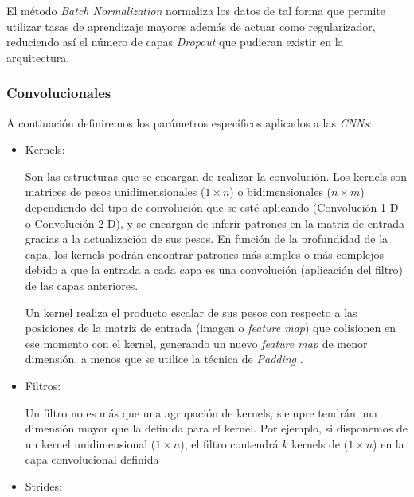 \begin{itemize}
                    El método \textit{Batch Normalization} \cite{BatchNormalization} normaliza los datos de tal forma que permite utilizar tasas de aprendizaje mayores además de actuar como regularizador, reduciendo así el número de capas \textit{Dropout} que pudieran existir en la arquitectura.

            \end{itemize}

            \subsubsection{Convolucionales}

                A contiuación definiremos los parámetros específicos aplicados a las \textit{CNNs}:

                \begin{itemize}

                    \item Kernels:

                        Son las estructuras que se encargan de realizar la convolución. Los kernels son matrices de pesos unidimensionales ($1 \times n$) o bidimensionales ($n \times m$) dependiendo del tipo de convolución que se esté aplicando (Convolución 1-D o Convolución 2-D), y se encargan de inferir patrones en la matriz de entrada gracias a la actualización de sus pesos. En función de la profundidad de la capa, los kernels podrán encontrar patrones más simples o más complejos debido a que la entrada a cada capa es una convolución (aplicación del filtro) de las capas anteriores.

                        Un kernel realiza el producto escalar de sus pesos con respecto a las posiciones de la matriz de entrada (imagen o \textit{feature map}) que colisionen en ese momento con el kernel, generando un nuevo \textit{feature map} de menor dimensión, a menos que se utilice la técnica de \textit{Padding} \cite{Kernels}.
                         
                    \item Filtros:

                        Un filtro no es más que una agrupación de kernels, siempre tendrán una dimensión mayor que la definida para el kernel. Por ejemplo, si disponemos de un kernel unidimensional ($1 \times n$), el filtro contendrá $k$ kernels de ($1 \times n$) en la capa convolucional definida \cite{FiltersFeatureMaps}

                    \item Strides:


\end{itemize}
